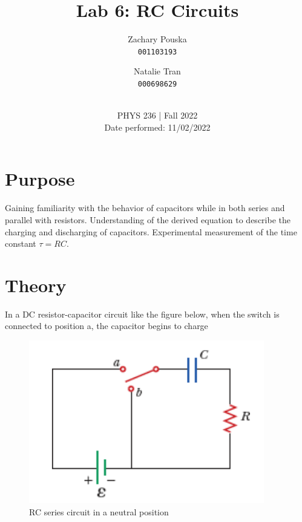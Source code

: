 \documentclass[titlepage]{article}
\begin{document}
\title{\textbf{Lab 6: RC Circuits}}
\author{
    Zachary Pouska\\
    \texttt{001103193}\\
    \and
    Natalie Tran \\ 
    \texttt{000698629}\\ \\
} 

\date{PHYS 236 | Fall 2022\\
Date performed: 11/02/2022}


	\maketitle



	\section{Purpose}
    Gaining familiarity with the behavior of capacitors while in both series and parallel with resistors. Understanding of the derived equation to describe the charging and discharging of capacitors. Experimental measurement of the time constant $\tau=RC$.


	\section{Theory}	
    In a DC resistor-capacitor circuit like the figure below, when the switch is connected to position a, the capacitor begins to charge 

    \begin{figure}[hbt!]
        \centering
        \caption{RC series circuit in a neutral position}
        \includegraphics[scale=0.3]{images/theory/circuit.png}
    \end{figure}
\end{document}
